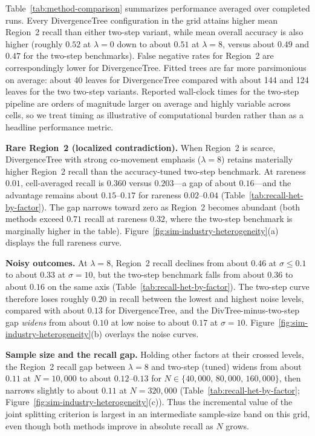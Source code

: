 \documentclass[11pt,letterpaper,english]{article}
\theoremstyle{definition}
\theoremstyle{definition}
\begin{document}
\begin{bibunit}
Table~\ref{tab:method-comparison} summarizes performance averaged over completed runs. Every DivergenceTree configuration in the grid attains higher mean Region~2 recall than either two-step variant, while mean overall accuracy is also higher (roughly $0.52$ at $\lambda=0$ down to about $0.51$ at $\lambda=8$, versus about $0.49$ and $0.47$ for the two-step benchmarks). False negative rates for Region~2 are correspondingly lower for DivergenceTree. Fitted trees are far more parsimonious on average: about 40 leaves for DivergenceTree compared with about 144 and 124 leaves for the two two-step variants. Reported wall-clock times for the two-step pipeline are orders of magnitude larger on average and highly variable across cells, so we treat timing as illustrative of computational burden rather than as a headline performance metric.

\vspace{6pt}
\noindent
\textbf{Rare Region~2 (localized contradiction).}
When Region~2 is scarce, DivergenceTree with strong co-movement emphasis ($\lambda=8$) retains materially higher Region~2 recall than the accuracy-tuned two-step benchmark. At rareness $0.01$, cell-averaged recall is $0.360$ versus $0.203$---a gap of about $0.16$---and the advantage remains about $0.15$--$0.17$ for rareness $0.02$--$0.04$ (Table~\ref{tab:recall-het-by-factor}). The gap narrows toward zero as Region~2 becomes abundant (both methods exceed $0.71$ recall at rareness $0.32$, where the two-step benchmark is marginally higher in the table). Figure~\ref{fig:sim-industry-heterogeneity}(a) displays the full rareness curve.

\vspace{6pt}
\noindent
\textbf{Noisy outcomes.}
At $\lambda=8$, Region~2 recall declines from about $0.46$ at $\sigma\le 0.1$ to about $0.33$ at $\sigma=10$, but the two-step benchmark falls from about $0.36$ to about $0.16$ on the same axis (Table~\ref{tab:recall-het-by-factor}). The two-step curve therefore loses roughly $0.20$ in recall between the lowest and highest noise levels, compared with about $0.13$ for DivergenceTree, and the DivTree-minus-two-step gap \emph{widens} from about $0.10$ at low noise to about $0.17$ at $\sigma=10$. Figure~\ref{fig:sim-industry-heterogeneity}(b) overlays the noise curves.

\vspace{6pt}
\noindent
\textbf{Sample size and the recall gap.}
Holding other factors at their crossed levels, the Region~2 recall gap between $\lambda=8$ and two-step (tuned) widens from about $0.11$ at $N=10{,}000$ to about $0.12$--$0.13$ for $N\in\{40{,}000,\,80{,}000,\,160{,}000\}$, then narrows slightly to about $0.11$ at $N=320{,}000$ (Table~\ref{tab:recall-het-by-factor}; Figure~\ref{fig:sim-industry-heterogeneity}(c)). Thus the incremental value of the joint splitting criterion is largest in an intermediate sample-size band on this grid, even though both methods improve in absolute recall as $N$ grows.


\end{bibunit}
\end{document}
